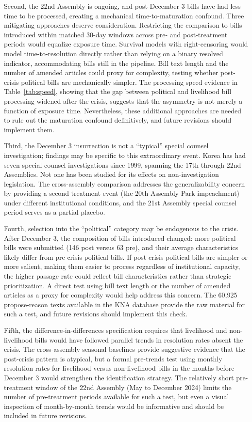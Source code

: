 \documentclass[11pt]{article}
\begin{document}
Second, the 22nd Assembly is ongoing, and post-December 3 bills have had less time to be processed, creating a mechanical time-to-maturation confound. Three mitigating approaches deserve consideration. Restricting the comparison to bills introduced within matched 30-day windows across pre- and post-treatment periods would equalize exposure time. Survival models with right-censoring would model time-to-resolution directly rather than relying on a binary resolved indicator, accommodating bills still in the pipeline. Bill text length and the number of amended articles could proxy for complexity, testing whether post-crisis political bills are mechanically simpler. The processing speed evidence in Table~\ref{tab:speed}, showing that the gap between political and livelihood bill processing widened after the crisis, suggests that the asymmetry is not merely a function of exposure time. Nevertheless, these additional approaches are needed to rule out the maturation confound definitively, and future revisions should implement them.

Third, the December 3 insurrection is not a ``typical'' special counsel investigation; findings may be specific to this extraordinary event. Korea has had seven special counsel investigations since 1999, spanning the 17th through 22nd Assemblies. Not one has been studied for its effects on non-investigation legislation. The cross-assembly comparison addresses the generalizability concern by providing a second treatment event (the 20th Assembly Park impeachment) under different institutional conditions, and the 21st Assembly special counsel period serves as a partial placebo.

Fourth, selection into the ``political'' category may be endogenous to the crisis. After December 3, the composition of bills introduced changed: more political bills were submitted (146 post versus 63 pre), and their average characteristics likely differ from pre-crisis political bills. If post-crisis political bills are simpler or more salient, making them easier to process regardless of institutional capacity, the higher passage rate could reflect bill characteristics rather than strategic prioritization. A direct test using bill text length or the number of amended articles as a proxy for complexity would help address this concern. The 60,925 propose-reason texts available in the KNA database provide the raw material for such a test, and future revisions should implement this check.

Fifth, the difference-in-differences specification requires that livelihood and non-livelihood bills would have followed parallel trends in resolution rates absent the crisis. The cross-assembly seasonal baselines provide suggestive evidence that the post-crisis pattern is atypical, but a formal pre-trends test using monthly resolution rates for livelihood versus non-livelihood bills in the months before December 3 would strengthen the identification strategy. The relatively short pre-treatment window of the 22nd Assembly (May to December 2024) limits the number of pre-treatment periods available for such a test, but even a visual inspection of month-by-month trends would be informative and should be included in future revisions.
\end{document}
